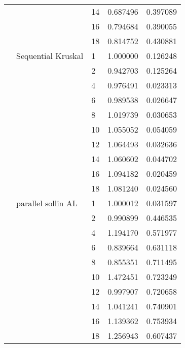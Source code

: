 \begin{tabular}{lllrr}
                      &                     & 14 &  0.687496 &  0.397089 \\
                      &                     & 16 &  0.794684 &  0.390055 \\
                      &                     & 18 &  0.814752 &  0.430881 \\
                      & Sequential Kruskal & 1  &  1.000000 &  0.126248 \\
                      &                     & 2  &  0.942703 &  0.125264 \\
                      &                     & 4  &  0.976491 &  0.023313 \\
                      &                     & 6  &  0.989538 &  0.026647 \\
                      &                     & 8  &  1.019739 &  0.030653 \\
                      &                     & 10 &  1.055052 &  0.054059 \\
                      &                     & 12 &  1.064493 &  0.032636 \\
                      &                     & 14 &  1.060602 &  0.044702 \\
                      &                     & 16 &  1.094182 &  0.020459 \\
                      &                     & 18 &  1.081240 &  0.024560 \\
                      & parallel sollin AL & 1  &  1.000012 &  0.031597 \\
                      &                     & 2  &  0.990899 &  0.446535 \\
                      &                     & 4  &  1.194170 &  0.571977 \\
                      &                     & 6  &  0.839664 &  0.631118 \\
                      &                     & 8  &  0.855351 &  0.711495 \\
                      &                     & 10 &  1.472451 &  0.723249 \\
                      &                     & 12 &  0.997907 &  0.720658 \\
                      &                     & 14 &  1.041241 &  0.740901 \\
                      &                     & 16 &  1.139362 &  0.753934 \\
                      &                     & 18 &  1.256943 &  0.607437 \\

\end{tabular}
